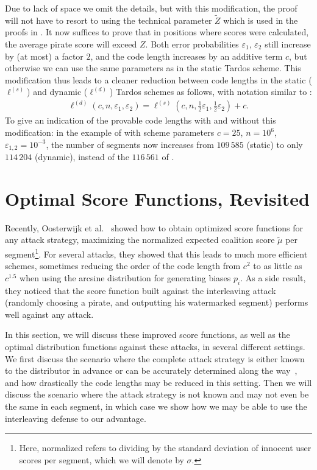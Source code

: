 \documentclass[10pt,a4paper,twocolumn]{article}
\newcommand{\eps}{\varepsilon}
\begin{document}
Due to lack of space we omit the details, but with this modification, the proof will not have to resort to using the technical parameter $\tilde{Z}$ which is used in the proofs in \cite{laarhoven13tit}. It now suffices to prove that in positions where scores were calculated, the average pirate score will exceed $Z$. Both error probabilities $\eps_1$, $\eps_2$ still increase by (at most) a factor $2$, and the code length increases by an additive term $c$, but otherwise we can use the same parameters as in the static Tardos scheme. This modification thus leads to a cleaner reduction between code lengths in the static ($\ell^{(s)}$) and dynamic ($\ell^{(d)}$) Tardos schemes as follows, with notation similar to \cite{laarhoven12wifs}:
\begin{align}
\ell^{(d)}(c,n,\eps_1,\eps_2) = \ell^{(s)}(c,n,\tfrac{1}{2}\eps_1,\tfrac{1}{2}\eps_2) + c.
\end{align}
To give an indication of the provable code lengths with and without this modification: in the example of \cite{laarhoven13tit} with scheme parameters $c = 25$, $n = 10^6$, $\eps_{1,2} = 10^{-3}$, the number of segments now increases from $109\,585$ (static) to only $114\,204$ (dynamic), instead of the $116\,561$ of \cite{laarhoven13tit}.




\section{Optimal Score Functions, Revisited}
\label{sec:scores}

Recently, Oosterwijk et al.~\cite{oosterwijk13} showed how to obtain optimized score functions for any attack strategy, maximizing the normalized expected coalition score $\tilde{\mu}$ per segment\footnote{Here, normalized refers to dividing by the standard deviation of innocent user scores per segment, which we will denote by $\sigma$.}. For several attacks, they showed that this leads to much more efficient schemes, sometimes reducing the order of the code length from $c^2$ to as little as $c^{1.5}$ when using the arcsine distribution for generating biases $p_i$. As a side result, they noticed that the score function built against the interleaving attack (randomly choosing a pirate, and outputting his watermarked segment) performs well against any attack. 

In this section, we will discuss these improved score functions, as well as the optimal distribution functions against these attacks, in several different settings. We first discuss the scenario where the complete attack strategy is either known to the distributor in advance or can be accurately determined along the way~\cite{furon09b}, and how drastically the code lengths may be reduced in this setting. Then we will discuss the scenario where the attack strategy is not known and may not even be the same in each segment, in which case we show how we may be able to use the interleaving defense to our advantage. 
\end{document}
